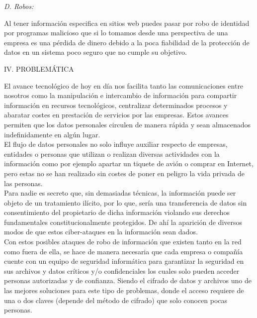 \documentclass[9pt,24pt,twocolumn]{article}
\begin{document}
\textit{D.  Robos: }

{Al tener información especifica en sitios web puedes pasar por robo de identidad por programas malicioso que si lo tomamos desde una perspectiva de una empresa es una pérdida de dinero debido a la poca fiabilidad de la protección de datos en un sistema poco seguro que no cumple su objetivo.}
\\

\begin{center}
{IV.  PROBLEMÁTICA}
\end{center}

{El avance tecnológico de hoy en día nos facilita tanto las comunicaciones entre nosotros como la manipulación e intercambio de información para compartir información en recursos tecnológicos, centralizar determinados procesos y abaratar costes en prestación de servicios por las empresas. Estos avances permiten que los datos personales circulen de manera rápida y sean almacenados indefinidamente en algún lugar.}
\\

{El flujo de datos personales no solo influye auxiliar respecto de empresas, entidades o personas que utilizan o realizan diversas actividades con la información como por ejemplo apartar un tiquete de avión o comprar en Internet, pero estas no se han realizado sin costes de poner en peligro la vida privada de las personas.}
\\

{Para nadie es secreto que, sin demasiadas técnicas, la información puede ser objeto de un tratamiento ilícito, por lo que, sería una transferencia de datos sin consentimiento del propietario de dicha información violando sus derechos fundamentales constitucionalmente protegidos. De ahí la aparición de diversos modos de que estos ciber-ataques en la información sean dados.}
\\

{Con estos posibles ataques de robo de información que existen tanto en la red como fuera de ella, se hace de manera necesaria que cada empresa o compañía cuente con un equipo de seguridad informática para garantizar la seguridad en sus archivos y datos críticos y/o confidenciales los cuales solo pueden acceder personas autorizadas y de confianza. Siendo el cifrado de datos y archivos uno de las mejores soluciones para este tipo de problemas, donde el acceso requiere de una o dos claves (depende del método de cifrado) que solo conocen pocas personas.}
\\
\end{document}
